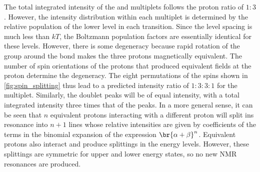 \documentclass[nobib,nofonts,nols,nohyper,draft]{tufte-handout}
\begin{document}

The total integrated intensity of the  and  multiplets follows the proton ratio of \( 1{:}3 \). 
However, the intensity distribution within each multiplet is determined by the relative population of the lower level in each transition. 
Since the level spacing is much less than \( kT \), the Boltzmann population factors are essentially identical for these levels. 
However, there is some degeneracy because rapid rotation of the  group around the  bond makes the three protons magnetically equivalent. 
The number of spin orientations of the  protons that produced equivalent fields at the  proton determine the degeneracy. 
The eight permutations of the  spins shown in \cref{fig:spin_splitting} thus lead to a predicted intensity ratio of \( 1{:}3{:}3{:}1 \) for the  multiplet. 
Similarly, the  doublet peaks will be of equal intensity, with a total integrated intensity three times that of the  peaks. 
In a more general sense, it can be seen that \( n \) equivalent protons interacting with a different proton will split ins resonance into \( n + 1 \) lines whose relative intensities are given by coefficients of the terms in the binomial expansion of the expression \( \br{\alpha + \beta}^n \). 
Equivalent protons also interact and produce splittings in the energy levels. 
However, these splittings are symmetric for upper and lower energy states, so no new NMR resonances are produced. 
\end{document}
